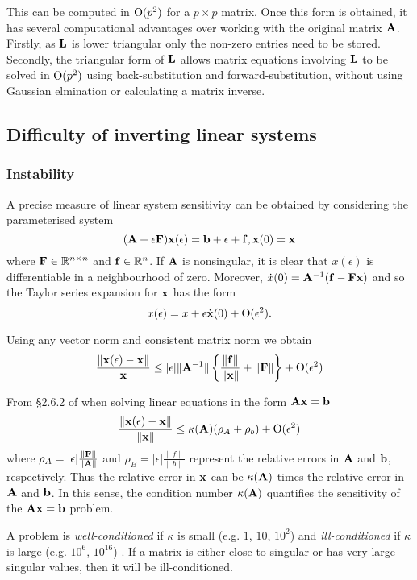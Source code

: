 \documentclass{amsart}[12pt]
\begin{document}
This can be computed in $\text{O}(p^2)$ for a $p \times p$ matrix. Once this form is obtained, it has several
computational advantages over working with the original matrix ${\bf A}$. Firstly, as ${\bf L}$ is lower triangular
only the non-zero entries need to be stored. Secondly, the triangular form of ${\bf L}$ allows matrix equations
involving ${\bf L}$ to be solved in $\text{O}{(p^2)}$ using back-substitution and forward-substitution, without using
Gaussian elmination or calculating a matrix inverse.

\subsection{Difficulty of inverting linear systems}

\subsubsection{Instability}

A precise measure of linear system sensitivity can be obtained by considering the parameterised system
\[
	({\bf A} + \epsilon {\bf F}) {\bf x}(\epsilon) = {\bf b} + \epsilon + {\bf f},  {\bf x}(0) = {\bf x}
\]
where ${\bf F} \in {\mathbb{R}}^{n \times n}$ and ${\bf f} \in {\mathbb{R}}^n$. If ${\bf A}$ is nonsingular, it is clear that $x(\epsilon)$ is
differentiable in a neighbourhood of zero. Moreover, $\dot{x}(0) = {\bf A}^{-1} ({\bf f} - {\bf F} {\bf x})$ and so the
Taylor series expansion for ${\bf x}$ has the form
\[
	x(\epsilon) = x + \epsilon \dot{{\bf x}}(0) + \text{O}(\epsilon^2).
\]

Using any vector norm and consistent matrix norm we obtain
\[
	\frac{\|{\bf x}(\epsilon) - {\bf x}\|}{{\bf x}} \leq |\epsilon| \|{\bf A}^{-1}\| \left\{\frac{\|{\bf f}\|}{\|{\bf x}\|} + \|{\bf F}\|\right\} + \text{O}(\epsilon^2)
\]

From \S 2.6.2 of \citep{Golub:1996:MC:248979}
when solving linear equations in the form ${\bf A} {\bf x} = {\bf b}$
\[
	\frac{\|{\bf x}(\epsilon) - {\bf x}\|}{\|{\bf x}\|} \leq \kappa({\bf A}) (\rho_A + \rho_b) + \text{O}(\epsilon^2)
\]
where $\rho_A = |\epsilon| \frac{\|{\bf F}\|}{\|{\bf A}\|}$ and $\rho_B = |\epsilon| \frac{\|f\|}{\|b\|}$ represent
the relative errors in ${\bf A}$ and ${\bf b}$, respectively. Thus the relative error in ${\bf x}$ can be $\kappa({\bf A})$
times the relative error in ${\bf A}$ and ${\bf b}$. In this sense, the condition number $\kappa({\bf A})$ quantifies the
sensitivity of the ${\bf A} {\bf x} = {\bf b}$ problem.


A problem is \emph{well-conditioned} if $\kappa$ is small (e.g. $1$, $10$, $10^2$) and \emph{ill-conditioned}
if $\kappa$ is large (e.g. $10^6$, $10^16$) \cite{trefethen97}.  If a matrix is either close to singular or
has very large singular values, then it will be ill-conditioned.
\end{document}
